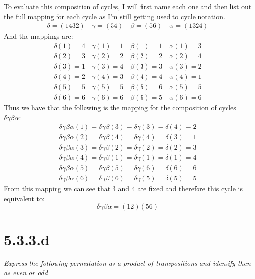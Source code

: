\documentclass[a4paper, 11pt]{article}
\begin{document}
\noindent To evaluate this composition of cycles, I will first name each one and then list out the full mapping for each cycle as I'm still getting used to cycle notation. 
	\begin{align*}
		\delta = (1432) \quad \gamma = (34) \quad \beta = (56) \quad \alpha = (1324) 
	\end{align*}
And the mappings are: 
	\begin{align*}
		\delta(1) = 4 \quad \gamma(1) = 1 \quad \beta(1) = 1 \quad \alpha(1) = 3 \\ 
		\delta(2) = 3 \quad \gamma(2) = 2 \quad \beta(2) = 2 \quad \alpha(2) = 4 \\ 
		\delta(3) = 1 \quad \gamma(3) = 4 \quad \beta(3) = 3 \quad \alpha(3) = 2 \\ 
		\delta(4) = 2 \quad \gamma(4) = 3 \quad \beta(4) = 4 \quad \alpha(4) = 1 \\ 
		\delta(5) = 5 \quad \gamma(5) = 5 \quad \beta(5) = 6 \quad \alpha(5) = 5 \\ 
		\delta(6) = 6 \quad \gamma(6) = 6 \quad \beta(6) = 5 \quad \alpha(6) = 6 
	\end{align*}
Thus we have that the following is the mapping for the composition of cycles $\delta\gamma\beta\alpha$: 
	\begin{align*}
		\delta\gamma\beta\alpha(1) = \delta\gamma\beta(3) = \delta\gamma(3) = \delta(4) = 2 \\ 
		\delta\gamma\beta\alpha(2) = \delta\gamma\beta(4) = \delta\gamma(4) = \delta(3) = 1 \\ 
		\delta\gamma\beta\alpha(3) = \delta\gamma\beta(2) = \delta\gamma(2) = \delta(2) = 3 \\ 
		\delta\gamma\beta\alpha(4) = \delta\gamma\beta(1) = \delta\gamma(1) = \delta(1) = 4 \\ 
		\delta\gamma\beta\alpha(5) = \delta\gamma\beta(5) = \delta\gamma(6) = \delta(6) = 6 \\ 
		\delta\gamma\beta\alpha(6) = \delta\gamma\beta(6) = \delta\gamma(5) = \delta(5) = 5
	\end{align*}
From this mapping we can see that 3 and 4 are fixed and therefore this cycle is equivalent to: 
	\begin{equation*}
		\delta\gamma\beta\alpha = (12)(56)
	\end{equation*}

\section*{5.3.3.d} 
\textit{Express the following permutation as a product of transpositions and identify then as even or odd} \\ 
\end{document}
